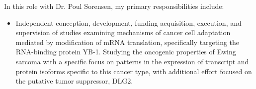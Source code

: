 \documentclass[11pt]{article}
\begin{document}
\begin{addmargin}[7.5em]{2em}%
	In this role with Dr. Poul Sorensen, my primary responsibilities include:
	\begin{itemize}
		\item Independent conception, development, funding acquisition, execution, and supervision of studies examining mechanisms of cancer cell adaptation mediated by modification of mRNA translation, specifically targeting the RNA-binding protein YB-1. Studying the oncogenic properties of Ewing sarcoma with a specific focus on patterns in the expression of transcript and protein isoforms specific to this cancer type, with additional effort focused on the putative tumor suppressor, DLG2.
	\end{itemize}
\end{addmargin}
\end{document}
